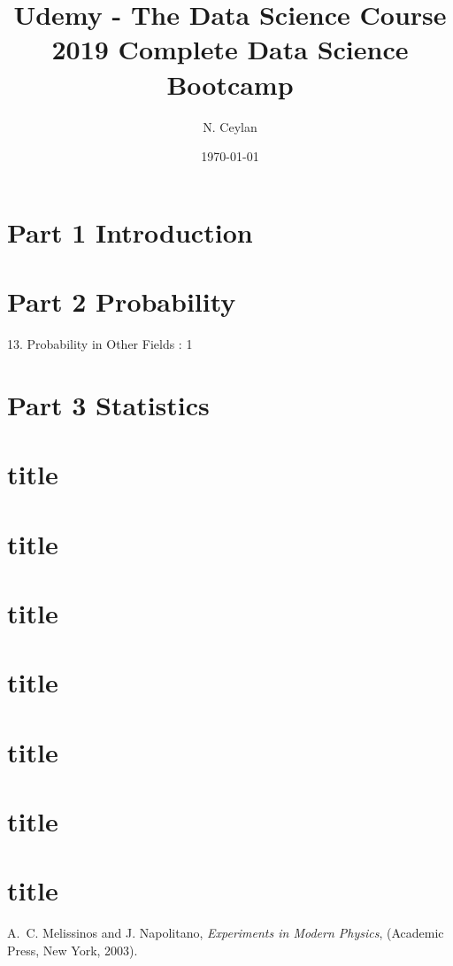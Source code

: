 \documentclass[letterpaper,12pt]{article}
\begin{document}
\title{Udemy - The Data Science Course 2019 Complete Data Science Bootcamp}
\author{N. Ceylan}
\date{\today}
\maketitle






\section{ Part 1 Introduction}


\section{ Part 2 Probability}

13. Probability in Other Fields : 1 

\section{Part 3 Statistics}



\section{title}



\section{title}
\section{title}

\section{title}

\section{title}

\section{title}

\section{title}



\begin{thebibliography}{99}

A.~C. Melissinos and J. Napolitano, \textit{Experiments in Modern Physics},
(Academic Press, New York, 2003).


\end{thebibliography}
\end{document}
